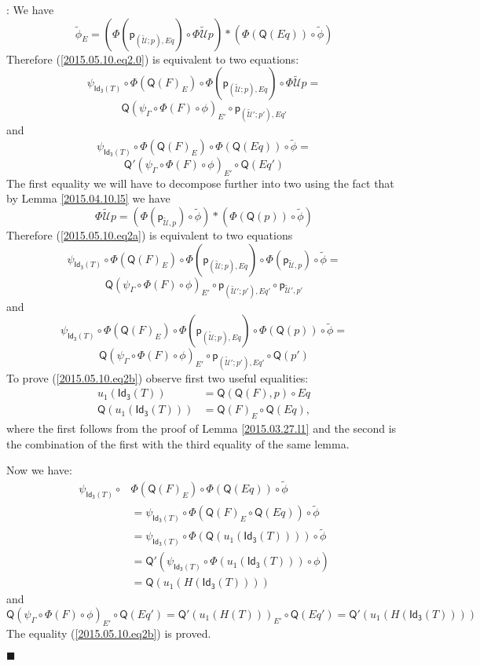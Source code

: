 \documentclass[12pt]{article}
\numberwithin{equation}{section}
\newenvironment{eq}{\begin{equation}}{\end{equation}}
\newenvironment{myproof}{{\bf Proof}:}{$\blacksquare$ \vskip 5mm }
\newcommand{\wt}{\widetilde}
\newcommand{\p}{\mathsf{p}}
\newcommand{\Idx}{\mathsf{Id_3}} %
\newcommand{\U}{\mathcal{U}}
\newcommand{\Q}{\mathsf{Q}}
\begin{document}
\begin{myproof}
We have
%
$$\wt{\phi}_E=(\Phi(\p_{(\wt{\U};p),Eq})\circ
\Phi\wt{\U}p)*(\Phi(\Q(Eq))\circ\wt{\phi})$$
%
Therefore (\ref{2015.05.10.eq2.0}) is equivalent to two equations:
%
$$\psi_{\Idx(T)}\circ \Phi(\Q(F)_E)\circ \Phi(\p_{(\wt{\U};p),Eq})\circ
\Phi\wt{\U}p=$$
\begin{eq}
\label{2015.05.10.eq2a}
\Q(\psi_{\Gamma}\circ \Phi(F)\circ \phi)_{E'}\circ \p_{(\wt{\U}';p'),Eq'}
\end{eq}%
%
and
%
$$\psi_{\Idx(T)}\circ \Phi(\Q(F)_E)\circ \Phi(\Q(Eq))\circ\wt{\phi}=$$
\begin{eq}
\label{2015.05.10.eq2b}
\Q'(\psi_{\Gamma}\circ \Phi(F)\circ \phi)_{E'}\circ \Q(Eq')
\end{eq}%
%
The first equality we will have to decompose further into two using the fact
that by Lemma \ref{2015.04.10.l5} we have
%
$$\Phi\wt{\U}p=(\Phi(\p_{\wt{\U},p})\circ\wt{\phi})*(\Phi(\Q(p))\circ \wt{\phi})$$
%
Therefore (\ref{2015.05.10.eq2a}) is equivalent to two equations
%
$$\psi_{\Idx(T)}\circ \Phi(\Q(F)_E)\circ \Phi(\p_{(\wt{\U};p),Eq})\circ
\Phi(\p_{\wt{\U},p})\circ\wt{\phi}=$$
\begin{eq}
\label{2015.05.10.eq2aa} \Q(\psi_{\Gamma}\circ \Phi(F)\circ \phi)_{E'}\circ
\p_{(\wt{\U}';p'),Eq'}\circ \p_{\wt{\U}',p'}
\end{eq}%
%
and
%
$$\psi_{\Idx(T)}\circ \Phi(\Q(F)_E)\circ \Phi(\p_{(\wt{\U};p),Eq})\circ
\Phi(\Q(p))\circ\wt{\phi}=$$
\begin{eq}
\label{2015.05.10.eq2ab} \Q(\psi_{\Gamma}\circ \Phi(F)\circ \phi)_{E'}\circ
\p_{(\wt{\U}';p'),Eq'}\circ \Q(p')
\end{eq}%
%
To prove (\ref{2015.05.10.eq2b}) observe first two useful equalities:
%
\begin{align*}
  u_1(\Idx(T))&=\Q(\Q(F),p)\circ Eq \\
  \Q(u_1(\Idx(T)))&=\Q(F)_{E}\circ \Q(Eq),
\end{align*}
%
where the first follows from the proof of Lemma \ref{2015.03.27.l1} and the
second is the combination of the first with the third equality of the same
lemma.

Now we have:
%
\begin{align*}
  \psi_{\Idx(T)}\circ & \Phi(\Q(F)_E)\circ \Phi(\Q(Eq))\circ\wt{\phi} \\
    & = \psi_{\Idx(T)}\circ \Phi(\Q(F)_E\circ \Q(Eq))\circ\wt{\phi} \\
    & = \psi_{\Idx(T)}\circ \Phi(\Q(u_1(\Idx(T))))\circ \wt{\phi} \\
    & = \Q'(\psi_{\Idx(T)}\circ \Phi(u_1(\Idx(T)))\circ \phi) \\
    & = \Q(u_1(H(\Idx(T))))
\end{align*}
%
and
%
$$\Q(\psi_{\Gamma}\circ \Phi(F)\circ \phi)_{E'}\circ
\Q(Eq')=\Q'(u_1(H(T)))_{E'}\circ \Q(Eq')=\Q'(u_1(H(\Idx(T))))$$
%
The equality (\ref{2015.05.10.eq2b}) is proved.


\end{myproof}
\end{document}
